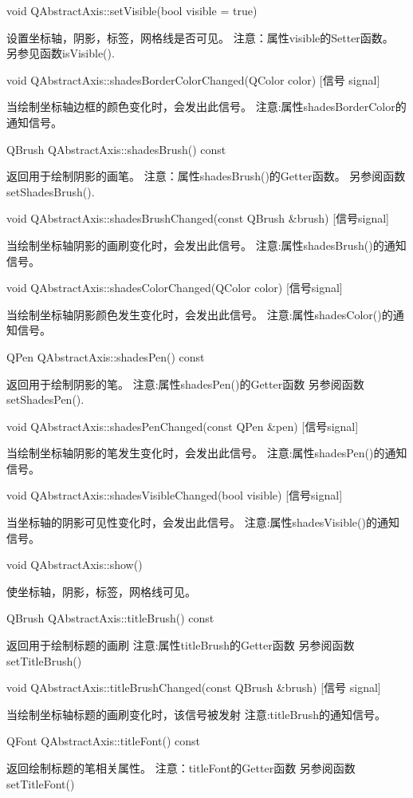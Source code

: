void QAbstractAxis::setVisible(bool visible = true) 

设置坐标轴，阴影，标签，网格线是否可见。 注意：属性visible的Setter函数。 另参见函数isVisible().

void QAbstractAxis::shadesBorderColorChanged(QColor color) [信号
signal] 

当绘制坐标轴边框的颜色变化时，会发出此信号。 注意:属性shadesBorderColor的通知信号。

QBrush QAbstractAxis::shadesBrush() const 

返回用于绘制阴影的画笔。 注意：属性shadesBrush()的Getter函数。 另参阅函数setShadesBrush().

void QAbstractAxis::shadesBrushChanged(const QBrush \&brush) [信号signal] 

当绘制坐标轴阴影的画刷变化时，会发出此信号。 注意:属性shadesBrush()的通知信号。

void QAbstractAxis::shadesColorChanged(QColor color) [信号signal] 

当绘制坐标轴阴影颜色发生变化时，会发出此信号。 注意:属性shadesColor()的通知信号。

QPen QAbstractAxis::shadesPen() const 

返回用于绘制阴影的笔。 注意:属性shadesPen()的Getter函数 另参阅函数setShadesPen().

void QAbstractAxis::shadesPenChanged(const QPen \&pen) [信号signal] 

当绘制坐标轴阴影的笔发生变化时，会发出此信号。 注意:属性shadesPen()的通知信号。

void QAbstractAxis::shadesVisibleChanged(bool visible) [信号signal] 

当坐标轴的阴影可见性变化时，会发出此信号。 注意:属性shadesVisible()的通知信号。

void QAbstractAxis::show() 

使坐标轴，阴影，标签，网格线可见。

QBrush QAbstractAxis::titleBrush() const 

返回用于绘制标题的画刷 注意:属性titleBrush的Getter函数 另参阅函数setTitleBrush()

void QAbstractAxis::titleBrushChanged(const QBrush \&brush) [信号
signal] 

当绘制坐标轴标题的画刷变化时，该信号被发射 注意:titleBrush的通知信号。

QFont QAbstractAxis::titleFont() const 

返回绘制标题的笔相关属性。 注意：titleFont的Getter函数 另参阅函数setTitleFont()

